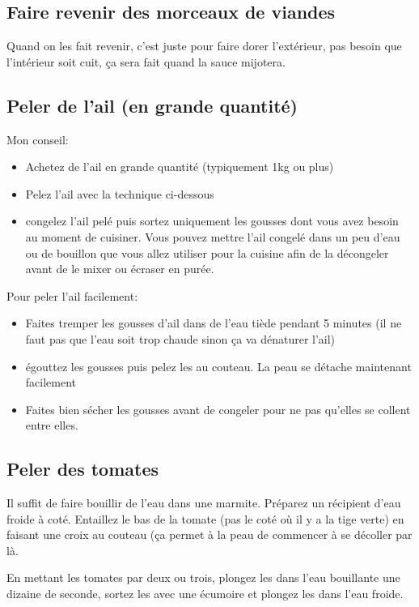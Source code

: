 \documentclass[a4paper,twoside,openright]{report}
\begin{document}
\subsection{Faire revenir des morceaux de viandes}
Quand on les fait revenir, c'est juste pour faire dorer l'extérieur, pas besoin que l'intérieur soit cuit, ça sera fait quand la sauce mijotera.

\subsection{Peler de l'ail (en grande quantité)}\label{sec:peler_ail}

Mon conseil:
\begin{itemize}
\item Achetez de l'ail en grande quantité (typiquement 1kg ou plus)
\item Pelez l'ail avec la technique ci-dessous
\item congelez l'ail pelé puis sortez uniquement les gousses dont vous avez besoin au moment de cuisiner. Vous pouvez mettre l'ail congelé dans un peu d'eau ou de bouillon que vous allez utiliser pour la cuisine afin de la décongeler avant de le mixer ou écraser en purée. 
\end{itemize}

Pour peler l'ail facilement:
\begin{itemize}
\item Faites tremper les gousses d'ail dans de l'eau tiède pendant 5 minutes (il ne faut pas que l'eau soit trop chaude sinon ça va dénaturer l'ail)
\item égouttez les gousses puis pelez les au couteau. La peau se détache maintenant facilement
\item Faites bien sécher les gousses avant de congeler pour ne pas qu'elles se collent entre elles. 
\end{itemize}

\subsection{Peler des tomates}\label{sec:peler_tomate}
Il suffit de faire bouillir de l'eau dans une marmite. Préparez un récipient d'eau froide à coté.
Entaillez le bas de la tomate (pas le coté où il y a la tige verte) en faisant une croix au couteau (ça permet à la peau de commencer à se décoller par là. 

En mettant les tomates par deux ou trois, plongez les dans l'eau bouillante une dizaine de seconde, sortez les avec une écumoire et plongez les dans l'eau froide. 
\end{document}

